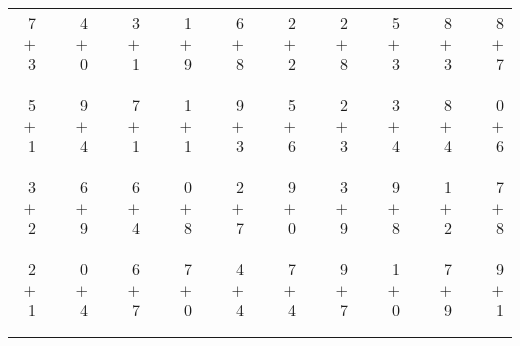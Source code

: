\documentclass[12pt, letterpaper]{article}
\begin{document}
\begin{tabular}{rrrrrrrrrrrrrrrrrrr}
7 & & 4 & & 3 & & 1 & & 6 & & 2 & & 2 & & 5 & & 8 & & 8\\
$+$ 3 & & $+$ 0 & & $+$ 1 & & $+$ 9 & & $+$ 8 & & $+$ 2 & & $+$ 8 & & $+$ 3 & & $+$ 3 & & $+$ 7\\
\cline{1-1} \cline{3-3} \cline{5-5} \cline{7-7} \cline{9-9} \cline{11-11} \cline{13-13} \cline{15-15} \cline{17-17} \cline{19-19} \\ \\
5 & & 9 & & 7 & & 1 & & 9 & & 5 & & 2 & & 3 & & 8 & & 0\\
$+$ 1 & & $+$ 4 & & $+$ 1 & & $+$ 1 & & $+$ 3 & & $+$ 6 & & $+$ 3 & & $+$ 4 & & $+$ 4 & & $+$ 6\\
\cline{1-1} \cline{3-3} \cline{5-5} \cline{7-7} \cline{9-9} \cline{11-11} \cline{13-13} \cline{15-15} \cline{17-17} \cline{19-19} \\ \\
3 & & 6 & & 6 & & 0 & & 2 & & 9 & & 3 & & 9 & & 1 & & 7\\
$+$ 2 & & $+$ 9 & & $+$ 4 & & $+$ 8 & & $+$ 7 & & $+$ 0 & & $+$ 9 & & $+$ 8 & & $+$ 2 & & $+$ 8\\
\cline{1-1} \cline{3-3} \cline{5-5} \cline{7-7} \cline{9-9} \cline{11-11} \cline{13-13} \cline{15-15} \cline{17-17} \cline{19-19} \\ \\
2 & & 0 & & 6 & & 7 & & 4 & & 7 & & 9 & & 1 & & 7 & & 9\\
$+$ 1 & & $+$ 4 & & $+$ 7 & & $+$ 0 & & $+$ 4 & & $+$ 4 & & $+$ 7 & & $+$ 0 & & $+$ 9 & & $+$ 1\\
\cline{1-1} \cline{3-3} \cline{5-5} \cline{7-7} \cline{9-9} \cline{11-11} \cline{13-13} \cline{15-15} \cline{17-17} \cline{19-19} \\ \\
\end{tabular}
\newpage
\end{document}
